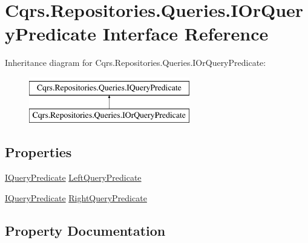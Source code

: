 \hypertarget{interfaceCqrs_1_1Repositories_1_1Queries_1_1IOrQueryPredicate}{}\section{Cqrs.\+Repositories.\+Queries.\+I\+Or\+Query\+Predicate Interface Reference}
\label{interfaceCqrs_1_1Repositories_1_1Queries_1_1IOrQueryPredicate}
Inheritance diagram for Cqrs.\+Repositories.\+Queries.\+I\+Or\+Query\+Predicate\+:\begin{figure}[H]
\begin{center}
\leavevmode
\includegraphics[height=2.000000cm]{interfaceCqrs_1_1Repositories_1_1Queries_1_1IOrQueryPredicate}
\end{center}
\end{figure}
\subsection*{Properties}
\begin{DoxyCompactItemize}
\item 
\hyperlink{interfaceCqrs_1_1Repositories_1_1Queries_1_1IQueryPredicate}{I\+Query\+Predicate} \hyperlink{interfaceCqrs_1_1Repositories_1_1Queries_1_1IOrQueryPredicate_a714d125899714f5aabc2d50e4ffb9834_a714d125899714f5aabc2d50e4ffb9834}{Left\+Query\+Predicate}
\item 
\hyperlink{interfaceCqrs_1_1Repositories_1_1Queries_1_1IQueryPredicate}{I\+Query\+Predicate} \hyperlink{interfaceCqrs_1_1Repositories_1_1Queries_1_1IOrQueryPredicate_a72ad26892989a09527ead9a2ecce5d47_a72ad26892989a09527ead9a2ecce5d47}{Right\+Query\+Predicate}
\end{DoxyCompactItemize}


\subsection{Property Documentation}
\mbox{\label{interfaceCqrs_1_1Repositories_1_1Queries_1_1IOrQueryPredicate_a714d125899714f5aabc2d50e4ffb9834_a714d125899714f5aabc2d50e4ffb9834}} 

